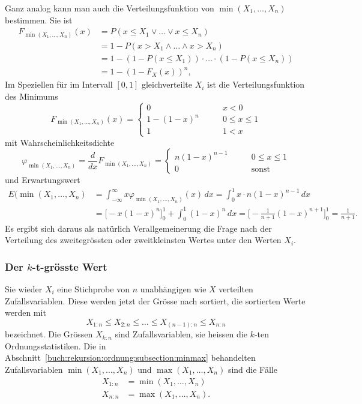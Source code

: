 Ganz analog kann man auch die Verteilungsfunktion von
$\operatorname{min}(X_1,\dots,X_n)$ bestimmen.
Sie ist
\begin{align*}
F_{\operatorname{min}(X_1,\dots,X_n)}(x)
&=
P(x\le X_1\vee \dots \vee x\le X_n)
\\
&=
1-
P(x > X_1\wedge \dots \wedge x > X_n)
\\
&=
1-
(1-P(x\le X_1)) \cdot\ldots\cdot (1-P(x\le X_n))
\\
&=
1-(1-F_X(x))^n,
\end{align*}
Im Speziellen für im Intervall $[0,1]$ gleichverteilte $X_i$ ist die
Verteilungsfunktion des Minimums
\[
F_{\operatorname{min}(X_1,\dots,X_n)}(x)
=
\begin{cases}
0        &\qquad x<0        \\
1-(1-x)^n&\qquad 0\le x\le 1\\
1        &\qquad 1 < x
\end{cases}
\]
mit Wahrscheinlichkeitsdichte
\[
\varphi_{\operatorname{min}(X_1,\dots,X_n)}
=
\frac{d}{dx}
F_{\operatorname{min}(X_1,\dots,X_n)}
=
\begin{cases}
n(1-x)^{n-1}&\qquad 0\le x\le 1\\
0           &\qquad \text{sonst}
\end{cases}
\]
und Erwartungswert
\begin{align*}
E(\operatorname{min}(X_1,\dots,X_n)
&=
\int_{-\infty}^\infty x\varphi_{\operatorname{min}(X_1,\dots,X_n)}(x)\,dx
=
\int_0^1 x\cdot n(1-x)^{n-1}\,dx
\\
&=
\bigl[ -x(1-x)^n \bigr]_0^1 + \int_0^1 (1-x)^n\,dx
=
\biggl[
-
\frac{1}{n+1}
(1-x)^{n+1}
\biggr]_0^1
=
\frac{1}{n+1}.
\end{align*}
Es ergibt sich daraus als natürlich Verallgemeinerung die Frage nach
der Verteilung des zweitegrössten oder zweitkleinsten Wertes unter den
Werten $X_i$.

\subsubsection{Der $k$-t-grösste Wert}
Sie wieder $X_i$ eine Stichprobe von $n$ unabhängigen wie $X$ verteilten
Zufallsvariablen.
Diese werden jetzt der Grösse nach sortiert, die sortierten Werte werden
mit
\[
X_{1:n} \le X_{2:n} \le \dots \le X_{(n-1):n} \le X_{n:n}
\]
bezeichnet.
Die Grössen $X_{k:n}$ sind Zufallsvariablen, sie heissen die $k$-ten
Ordnungsstatistiken.
Die in Abschnitt~\ref{buch:rekursion:ordnung:subsection:minmax} behandelten Zufallsvariablen
$\operatorname{min}(X_1,\dots,X_n)$
und
$\operatorname{max}(X_1,\dots,X_n)$
sind die Fälle
\begin{align*}
X_{1:n} &= \operatorname{min}(X_1,\dots,X_n) \\
X_{n:n} &= \operatorname{max}(X_1,\dots,X_n).
\end{align*}

